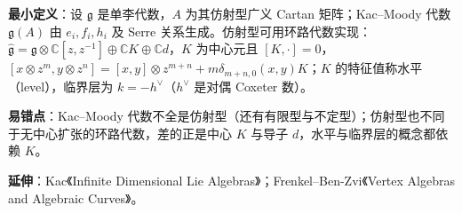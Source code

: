 \textbf{最小定义}：设 $\mathfrak g$ 是单李代数，$A$ 为其仿射型广义 Cartan 矩阵；Kac--Moody 代数 $\mathfrak g(A)$ 由 $e_i,f_i,h_i$ 及 Serre 关系生成。仿射型可用环路代数实现：$\hat{\mathfrak g}=\mathfrak g\otimes\mathbb C[z,z^{-1}]\oplus\mathbb C K\oplus\mathbb C d$，$K$ 为中心元且 $[K,\cdot]=0$，$[x\otimes z^m,y\otimes z^n]=[x,y]\otimes z^{m+n}+m\delta_{m+n,0}(x,y)K$；$K$ 的特征值称水平（level），临界层为 $k=-h^\vee$（$h^\vee$ 是对偶 Coxeter 数）。

\textbf{易错点}：Kac--Moody 代数不全是仿射型（还有有限型与不定型）；仿射型也不同于无中心扩张的环路代数，差的正是中心 $K$ 与导子 $d$，水平与临界层的概念都依赖 $K$。

\textbf{延伸}：Kac《Infinite Dimensional Lie Algebras》；Frenkel--Ben-Zvi《Vertex Algebras and Algebraic Curves》。
